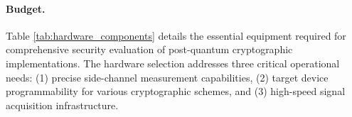 \documentclass[11pt, a4paper]{article}
\begin{document}







\paragraph{Budget.}

Table \ref{tab:hardware_components} details the essential 
equipment required for comprehensive security evaluation of 
post-quantum cryptographic implementations. The hardware 
selection addresses three critical operational needs: 
(1) precise side-channel measurement capabilities, (2)
 target device programmability for various cryptographic schemes, 
 and (3) high-speed signal acquisition infrastructure.
\end{document}
